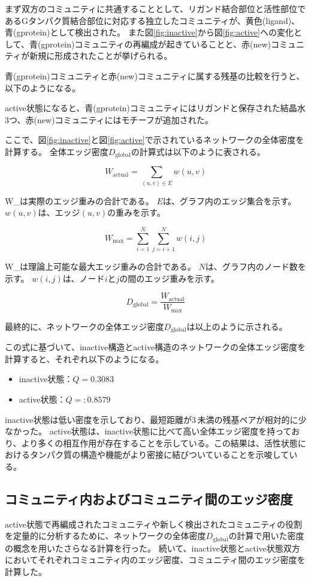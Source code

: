 \newpage

まず双方のコミュニティに共通することとして、リガンド結合部位と活性部位であるGタンパク質結合部位に対応する独立したコミュニティが、黄色(ligand)、青(gprotein)として検出された。
また図\ref{fig:inactive}から図\ref{fig:active}への変化として、青(gprotein)コミュニティの再編成が起きていることと、赤(new)コミュニティが新規に形成されたことが挙げられる。

青(gprotein)コミュニティと赤(new)コミュニティに属する残基の比較を行うと、以下のようになる。


active状態になると、青(gprotein)コミュニティにはリガンドと保存された結晶水3つ、赤(new)コミュニティにはモチーフが追加された。

ここで、図\ref{fig:inactive}と図\ref{fig:active}で示されているネットワークの全体密度を計算する。
全体エッジ密度$D_{\text{global}}$の計算式は以下のように表される。

\[
W_{\text{actual}} = \sum_{(u, v) \in E} w(u, v)
\]

W_{}は実際のエッジ重みの合計である。
$E$は、グラフ内のエッジ集合を示す。
$w(u, v)$は、エッジ$(u, v)$の重みを示す。

\[
W_{\text{max}} = \sum_{i=1}^{N} \sum_{j=i+1}^{N} w(i, j)
\]

W_{}は理論上可能な最大エッジ重みの合計である。
$N$は、グラフ内のノード数を示す。
$w(i, j)$は、ノード$i$と$j$の間のエッジ重みを示す。

\[
D_{\text{global}} = \frac{W_{\text{actual}}}{W_{\text{max}}}
\label{eq:global_density}
\]

最終的に、ネットワークの全体エッジ密度$D_{\text{global}}$は以上のように示される。

この式に基づいて、inactive構造とactive構造のネットワークの全体エッジ密度を計算すると、それぞれ以下のようになる。
\begin{itemize}
    \item inactive状態：\( Q = 0.3083 \)
    \item active状態：\( Q = :0.8579 \)
\end{itemize}

inactive状態は低い密度を示しており、最短距離が3\,\text{\AA}未満の残基ペアが相対的に少なかった。
active状態は、inactive状態に比べて高い全体エッジ密度を持っており、より多くの相互作用が存在することを示している。この結果は、活性状態におけるタンパク質の構造や機能がより密接に結びついていることを示唆している。

\subsection{コミュニティ内およびコミュニティ間のエッジ密度}
active状態で再編成されたコミュニティや新しく検出されたコミュニティの役割を定量的に分析するために、ネットワークの全体密度$D_{\text{global}}$の計算で用いた密度の概念を用いたさらなる計算を行った。
続いて、inactive状態とactive状態双方においてそれぞれコミュニティ内のエッジ密度、コミュニティ間のエッジ密度を計算した。

